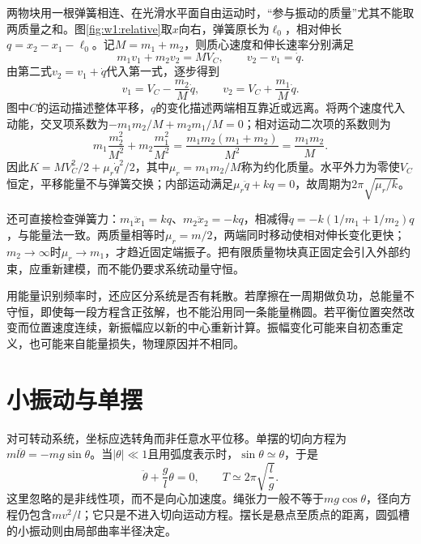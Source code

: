 两物块用一根弹簧相连、在光滑水平面自由运动时，“参与振动的质量”尤其不能取两质量之和。图\ref{fig:w1:relative}取$x$向右，弹簧原长为$\ell_0$，相对伸长$q=x_2-x_1-\ell_0$。记$M=m_1+m_2$，则质心速度和伸长速率分别满足
\[
m_1v_1+m_2v_2=MV_C,\qquad v_2-v_1=\dot q.
\]
由第二式$v_2=v_1+\dot q$代入第一式，逐步得到
\[
v_1=V_C-\frac{m_2}{M}\dot q,\qquad
v_2=V_C+\frac{m_1}{M}\dot q.
\]
图中$C$的运动描述整体平移，$q$的变化描述两端相互靠近或远离。将两个速度代入动能，交叉项系数为$-m_1m_2/M+m_2m_1/M=0$；相对运动二次项的系数则为
\[
m_1\frac{m_2^2}{M^2}+m_2\frac{m_1^2}{M^2}
=\frac{m_1m_2(m_1+m_2)}{M^2}=\frac{m_1m_2}{M}.
\]
因此$K=MV_C^2/2+\mu_r\dot q^2/2$，其中$\mu_r=m_1m_2/M$称为约化质量。水平外力为零使$V_C$恒定，平移能量不与弹簧交换；内部运动满足$\mu_r\ddot q+kq=0$，故周期为$2\pi\sqrt{\mu_r/k}$。

还可直接检查弹簧力：$m_1\ddot x_1=kq$、$m_2\ddot x_2=-kq$，相减得$\ddot q=-k(1/m_1+1/m_2)q$，与能量法一致。两质量相等时$\mu_r=m/2$，两端同时移动使相对伸长变化更快；$m_2\to\infty$时$\mu_r\to m_1$，才趋近固定端振子。把有限质量物块真正固定会引入外部约束，应重新建模，而不能仍要求系统动量守恒。

用能量识别频率时，还应区分系统是否有耗散。若摩擦在一周期做负功，总能量不守恒，即使每一段方程含正弦解，也不能沿用同一条能量椭圆。若平衡位置突然改变而位置速度连续，新振幅应以新的中心重新计算。振幅变化可能来自初态重定义，也可能来自能量损失，物理原因并不相同。


\section{小振动与单摆}
对可转动系统，坐标应选转角而非任意水平位移。单摆的切向方程为$ml\ddot\theta=-mg\sin\theta$。当$|\theta|\ll1$且用弧度表示时，$\sin\theta\simeq\theta$，于是
\[
\ddot\theta+\frac gl\theta=0,\qquad T\simeq2\pi\sqrt{\frac lg}.
\]
这里忽略的是非线性项，而不是向心加速度。绳张力一般不等于$mg\cos\theta$，径向方程仍包含$mv^2/l$；它只是不进入切向运动方程。摆长是悬点至质点的距离，圆弧槽的小振动则由局部曲率半径决定。

